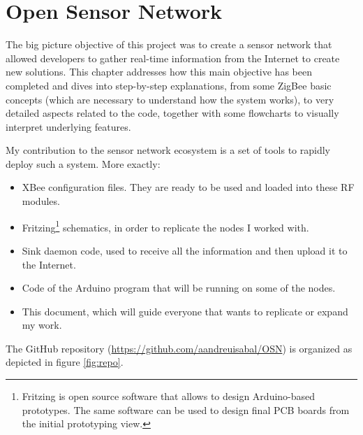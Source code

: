 \chapter{Open Sensor Network}
\label{Chapter5}



The big picture objective of this project was to create a sensor network that allowed developers to gather real-time information from the Internet to create new solutions\cite{barcelobottom}. This chapter addresses how this main objective has been completed and dives into step-by-step explanations, from some ZigBee basic concepts (which are necessary to understand how the system works), to very detailed aspects related to the code, together with some flowcharts to visually interpret underlying features.

My contribution to the sensor network ecosystem is a set of tools to rapidly deploy such a system. More exactly:

\begin{itemize}
    \item XBee\textregistered{} configuration files. They are ready to be used and loaded into these RF modules.
    \item Fritzing\footnote{Fritzing is open source software that allows to design Arduino-based prototypes. The same software can be used to design final PCB boards from the initial prototyping view.} schematics, in order to replicate the nodes I worked with.
    \item Sink daemon code, used to receive all the information and then upload it to the Internet.
    \item Code of the Arduino program that will be running on some of the nodes.
    \item This document, which will guide everyone that wants to replicate or expand my work.
\end{itemize}

The GitHub repository (\url{https://github.com/aandreuisabal/OSN}) is organized as depicted in figure \ref{fig:repo}.

